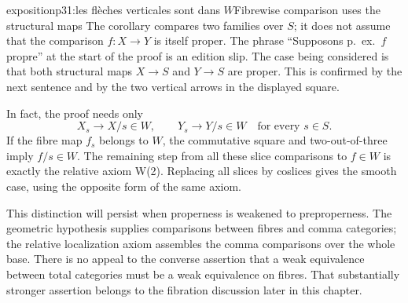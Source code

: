 \begin{dcomment}{exposition}{p31:les flèches verticales sont dans $W$}{Fibrewise comparison uses the structural maps}
The corollary compares two families over $S$; it does not assume that the comparison $f:X\to Y$ is itself proper. The phrase ``Supposons p.~ex.\ $f$ propre'' at the start of the proof is an edition slip. The case being considered is that both structural maps $X\to S$ and $Y\to S$ are proper. This is confirmed by the next sentence and by the two vertical arrows in the displayed square.

In fact, the proof needs only
\[
 X_s\longrightarrow X/s\in W,
 \qquad Y_s\longrightarrow Y/s\in W
 \quad\text{for every }s\in S.
\]
If the fibre map $f_s$ belongs to $W$, the commutative square and two-out-of-three imply $f/s\in W$. The remaining step from all these slice comparisons to $f\in W$ is exactly the relative axiom W(2). Replacing all slices by coslices gives the smooth case, using the opposite form of the same axiom.

This distinction will persist when properness is weakened to preproperness. The geometric hypothesis supplies comparisons between fibres and comma categories; the relative localization axiom assembles the comma comparisons over the whole base. There is no appeal to the converse assertion that a weak equivalence between total categories must be a weak equivalence on fibres. That substantially stronger assertion belongs to the fibration discussion later in this chapter.
\end{dcomment}

